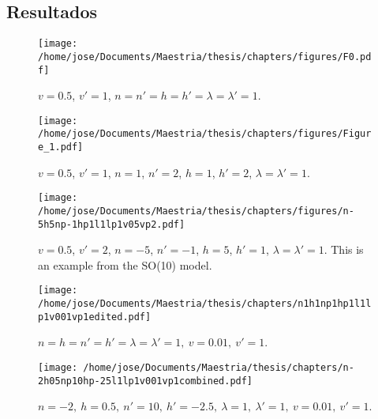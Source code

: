 \documentclass[14pt]{beamer}
\begin{document}
\subsection{Resultados}


\begin{frame}
\begin{figure}
	\centering
	\texttt{[image: /home/jose/Documents/Maestria/thesis/chapters/figures/F0.pdf]}
	\caption{$v=0.5$, $v'=1$, $n=n'=h=h'=\lambda=\lambda'=1$.}
\end{figure}
\end{frame}

\begin{frame}
\begin{figure}
	\centering
	\texttt{[image: /home/jose/Documents/Maestria/thesis/chapters/figures/Figure\_1.pdf]}
	\caption{$v = 0.5$, $v'=1$, $n=1$, $n'=2$, $h=1$, $h'=2$, $\lambda=\lambda'=1$.}
\end{figure}
\end{frame}

\begin{frame}
\begin{figure}
	\centering
	\texttt{[image: /home/jose/Documents/Maestria/thesis/chapters/figures/n-5h5np-1hp1l1lp1v05vp2.pdf]}
	\caption{$v = 0.5$, $v'=2$, $n=-5$, $n'=-1$, $h=5$, $h'=1$, $\lambda=\lambda'=1$. This is an example from the SO(10) model.}
	\label{fig:n-5h5np-1hp1l1lp1v05vp2}
\end{figure}
\end{frame}

\begin{frame}
\begin{figure}
	\centering
	\texttt{[image: /home/jose/Documents/Maestria/thesis/chapters/n1h1np1hp1l1lp1v001vp1edited.pdf]}
		\caption{$n = h = n' = h'  = \lambda=\lambda' = 1,\ v =0.01,\ v' = 1 $.}
		\label{fig:sol1}
\end{figure}
\end{frame}

\begin{frame}
\begin{figure}
	\centering
	\texttt{[image: /home/jose/Documents/Maestria/thesis/chapters/n-2h05np10hp-25l1lp1v001vp1combined.pdf]}
		\caption{$n = -2,\ h =0.5,\ n' = 10,\ h' = -2.5,\  \lambda=1,\ \lambda' = 1,\ v =0.01,\ v' = 1 $.}
		\label{fig:coaxial}
\end{figure}
\end{frame}
\end{document}
